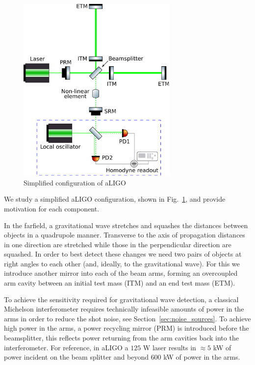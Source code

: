 \documentclass[aps,pra,superscriptaddress,reprint,nofootinbib]{revtex4-1}
\begin{document}
\begin{figure}
	\begin{center}
	\includegraphics[width=0.7\textwidth]{figures/aLIGO_internal_squeezing.pdf}
	\end{center}
	\caption{Simplified configuration of aLIGO}
	\label{fig:aLIGO_configuration}
\end{figure}
We study a simplified aLIGO configuration, shown in Fig.~\ref{fig:aLIGO_configuration}, and provide motivation for each component.


In the farfield, a gravitational wave stretches and squashes the distances between objects in a quadrupole manner. Transverse to the axis of propagation distances in one direction are stretched while those in the perpendicular direction are squashed. In order to best detect these changes we need two pairs of objects at right angles to each other (and, ideally, to the gravitational wave). For this we introduce another mirror into each of the beam arms, forming an overcoupled arm cavity between an initial test mass (ITM) and an end test mass (ETM).


To achieve the sensitivity required for gravitational wave detection, a classical Michelson interferometer requires technically infeasible amounts of power in the arms in order to reduce the shot noise, see Section~\ref{sec:noise_sources}.
To achieve high power in the arms, a power recycling mirror (PRM) is introduced before the beamsplitter, this reflects power returning from the arm cavities back into the interferometer. For reference, in aLIGO a $125$ W laser results in $\approx 5$ kW of power incident on the beam splitter and beyond $600$ kW of power in the arms.
\end{document}
